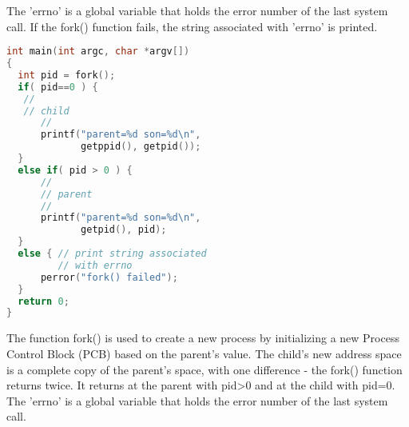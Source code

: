 \documentclass[12pt]{report}
\begin{document}
The 'errno' is a global variable that holds the error number of the last system call. If the fork() function fails, the string associated with 'errno' is printed.
\begin{lstlisting}[language=C]
int main(int argc, char *argv[])
{
  int pid = fork();
  if( pid==0 ) { 
   //
   // child
      //
      printf("parent=%d son=%d\n",
             getppid(), getpid());
  }
  else if( pid > 0 ) {
      //
      // parent
      //
      printf("parent=%d son=%d\n",
             getpid(), pid);
  }
  else { // print string associated
         // with errno   
      perror("fork() failed"); 
  }
  return 0;
}
\end{lstlisting}
\begin{tcolorbox}[colback=yellow!5, colframe=yellow!80!black, title={\faBookmark À retenir}]
The function fork() is used to create a new process by initializing a new Process Control Block (PCB) based on the parent's value. The child's new address space is a complete copy of the parent's space, with one difference - the fork() function returns twice. It returns at the parent with pid>0 and at the child with pid=0. The 'errno' is a global variable that holds the error number of the last system call.\end{tcolorbox}
\end{document}
